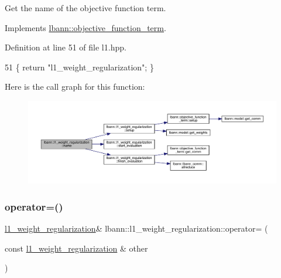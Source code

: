 Get the name of the objective function term. 

Implements \hyperlink{classlbann_1_1objective__function__term_a964fbfad3dd0434aa8f32c5fedf1079a}{lbann\+::objective\+\_\+function\+\_\+term}.



Definition at line 51 of file l1.\+hpp.


\begin{DoxyCode}
51 \{ \textcolor{keywordflow}{return} \textcolor{stringliteral}{"l1\_weight\_regularization"}; \}
\end{DoxyCode}
Here is the call graph for this function\+:\nopagebreak
\begin{figure}[H]
\begin{center}
\leavevmode
\includegraphics[width=350pt]{classlbann_1_1l1__weight__regularization_a4a41b6a07c36fc4f82364295a404ba1b_cgraph}
\end{center}
\end{figure}
\mbox{\label{classlbann_1_1l1__weight__regularization_ae6f3b7de9357ffd852372bb7e25a0c6a}} 
\subsubsection{\texorpdfstring{operator=()}{operator=()}}
{\footnotesize\ttfamily \hyperlink{classlbann_1_1l1__weight__regularization}{l1\+\_\+weight\+\_\+regularization}\& lbann\+::l1\+\_\+weight\+\_\+regularization\+::operator= (\begin{DoxyParamCaption}\item[{const \hyperlink{classlbann_1_1l1__weight__regularization}{l1\+\_\+weight\+\_\+regularization} \&}]{other }\end{DoxyParamCaption})\hspace{0.3cm}{\ttfamily [default]}}

